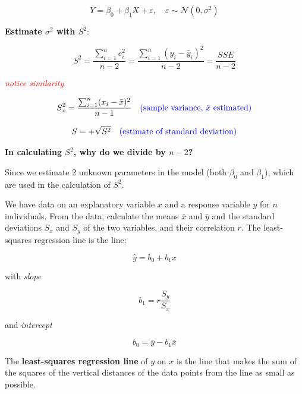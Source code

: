 \[
Y = \beta_0 + \beta_1 X + \varepsilon, \quad \varepsilon \sim \mathcal{N}(0, \sigma^2)
\]

\textbf{Estimate $\sigma^2$ with $S^2$}:

\[
S^2 = \frac{\sum_{i=1}^n e_i^2}{n - 2}
= \frac{\sum_{i=1}^n (y_i - \hat{y}_i)^2}{n - 2}
= \frac{SSE}{n - 2}
\]

\hfill \textcolor{red}{\textit{notice similarity}}

\[
S_x^2 = \frac{\sum_{i=1}^n (x_i - \bar{x})^2}{n - 1}
\quad \textcolor{blue}{\text{(sample variance, }\bar{x} \text{ estimated)}}
\]

\[
S = +\sqrt{S^2}
\quad \textcolor{blue}{\text{(estimate of standard deviation)}} \\
\]

\vspace{1em}

\textbf{In calculating $S^2$, why do we divide by $n-2$?}

Since we estimate 2 unknown parameters in the model (both $\beta_0$ and $\beta_1$), which are used in the calculation of $S^2$.

\begin{tcolorbox}[colback=yellow!5, colframe=yellow!50!black,
title={Equation of the Least-Squares Regression Line}, 
boxrule=0.5pt, sharp corners, breakable]

We have data on an explanatory variable $x$ and a response variable $y$ for $n$ individuals. From the data, calculate the means $\bar{x}$ and $\bar{y}$ and the standard deviations $S_x$ and $S_y$ of the two variables, and their correlation $r$. The least-squares regression line is the line:

\[
\hat{y} = b_0 + b_1 x
\]

with \textit{slope}

\[
b_1 = r \frac{S_y}{S_x}
\]

and \textit{intercept}

\[
b_0 = \bar{y} - b_1 \bar{x}
\]

\end{tcolorbox}

\begin{definition}
The \textbf{least-squares regression line} of $y$ on $x$ is the line that makes the sum of the squares of the vertical distances of the data points from the line as small as possible.
\end{definition}

